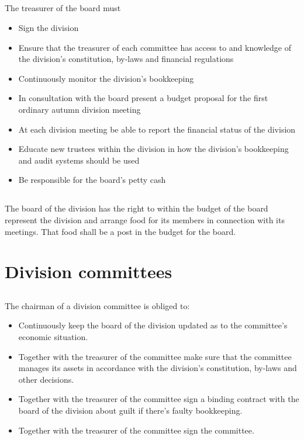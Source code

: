 \documentclass[a4paper]{dtek}
\begin{document}
\subsection{}
The treasurer of the board must
\begin{itemize}
  \item Sign the division%
  \item Ensure that the treasurer of each committee has access to and knowledge of the division's constitution, by-laws and financial regulations
  \item Continuously monitor the division's bookkeeping
  \item In consultation with the board present a budget proposal for the first ordinary autumn division meeting
  \item At each division meeting be able to report the financial status of the division
  \item Educate new trustees within the division in how the division's bookkeeping and audit systems should be used   
  \item Be responsible for the board's petty cash
\end{itemize}

\subsection{}
The board of the division has the right to within the budget of the board represent the division and arrange food for its members in connection with its meetings. That food shall be a post in the budget for the board.


\section{Division committees}
\label{sec:sektionsforeningar}
\subsection{}
The chairman of a division committee is obliged to:
\begin{itemize}
    \item Continuously keep the board of the division updated as to the committee's economic situation.
    \item Together with the treasurer of the committee make sure that the committee manages its assets in accordance with the division's constitution, by-laws and other decisions.
    \item Together with the treasurer of the committee sign a binding contract with the board of the division about guilt if there's faulty bookkeeping.
    \item Together with the treasurer of the committee sign the committee.%
\end{itemize}
\end{document}

